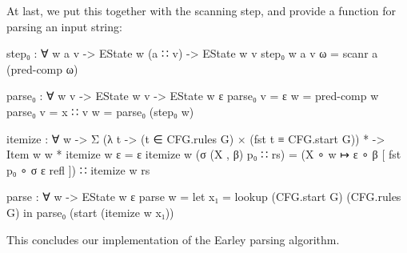 		At last, we put this together with the scanning step, and provide a
		function for parsing an input string:

		\begin{code}
			  step₀ : ∀ {w a v} ->
			    EState w (a ∷ v) ->
			    EState w v
			  step₀ {w} {a} {v} ω = scanr a (pred-comp ω)

			  parse₀ : ∀ {w v} ->
			     EState w v ->
			     EState w ε
			  parse₀ {v = ε} w = pred-comp w
			  parse₀ {v = x ∷ v} w = parse₀ (step₀ w)

			  itemize : ∀ w ->
			    Σ (λ t -> (t ∈ CFG.rules G) × (fst t ≡ CFG.start G)) * ->
			    Item w w *
			  itemize w ε = ε
			  itemize w (σ (X , β) p₀ ∷ rs) = (X ∘ w ↦ ε ∘ β [ fst p₀ ∘ σ ε refl ]) ∷ itemize w rs

			  parse : ∀ w -> EState w ε
			  parse w =
			    let x₁ = lookup (CFG.start G) (CFG.rules G) in
			    parse₀ (start (itemize w x₁))
		\end{code}

		This concludes our implementation of the Earley parsing algorithm.

